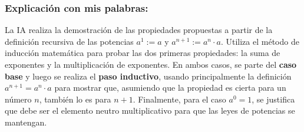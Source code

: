 \documentclass{article}
\begin{document}
\subsubsection{Explicación con mis palabras:}
La IA realiza la demostración de las propiedades propuestas a partir de 
la definición recursiva de las potencias \(a^1 := a\) y \(a^{n+1} := a^n \cdot a\).  
Utiliza el método de inducción matemática para probar las dos primeras propiedades: 
la suma de exponentes y la multiplicación de exponentes.  
En ambos casos, se parte del \textbf{caso base} y luego se realiza el \textbf{paso inductivo}, 
usando principalmente la definición \(a^{n+1} = a^n \cdot a\) para mostrar que, asumiendo que 
la propiedad es cierta para un número \(n\), también lo es para \(n+1\).  
Finalmente, para el caso \(a^0 = 1\), se justifica que debe ser el elemento neutro multiplicativo 
para que las leyes de potencias se mantengan.
\end{document}
